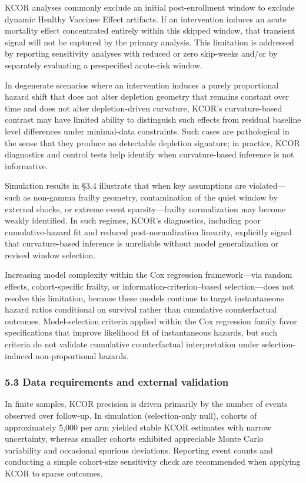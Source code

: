 \documentclass[
]{article}
\begin{document}
KCOR analyses commonly exclude an initial post-enrollment window to
exclude dynamic Healthy Vaccinee Effect artifacts. If an intervention
induces an acute mortality effect concentrated entirely within this
skipped window, that transient signal will not be captured by the
primary analysis. This limitation is addressed by reporting sensitivity
analyses with reduced or zero skip-weeks and/or by separately evaluating
a prespecified acute-risk window.

In degenerate scenarios where an intervention induces a purely
proportional hazard shift that does not alter depletion geometry that
remains constant over time and does not alter depletion-driven
curvature, KCOR's curvature-based contrast may have limited ability to
distinguish such effects from residual baseline level differences under
minimal-data constraints. Such cases are pathological in the sense that
they produce no detectable depletion signature; in practice, KCOR
diagnostics and control tests help identify when curvature-based
inference is not informative.

Simulation results in §3.4 illustrate that when key assumptions are
violated---such as non-gamma frailty geometry, contamination of the
quiet window by external shocks, or extreme event sparsity---frailty
normalization may become weakly identified. In such regimes, KCOR's
diagnostics, including poor cumulative-hazard fit and reduced
post-normalization linearity, explicitly signal that curvature-based
inference is unreliable without model generalization or revised window
selection.

Increasing model complexity within the Cox regression framework---via
random effects, cohort-specific frailty, or information-criterion--based
selection---does not resolve this limitation, because these models
continue to target instantaneous hazard ratios conditional on survival
rather than cumulative counterfactual outcomes. Model-selection criteria
applied within the Cox regression family favor specifications that
improve likelihood fit of instantaneous hazards, but such criteria do
not validate cumulative counterfactual interpretation under
selection-induced non-proportional hazards.

\subsubsection{5.3 Data requirements and external
validation}\label{data-requirements-and-external-validation}

In finite samples, KCOR precision is driven primarily by the number of
events observed over follow-up. In simulation (selection-only null),
cohorts of approximately 5,000 per arm yielded stable KCOR estimates
with narrow uncertainty, whereas smaller cohorts exhibited appreciable
Monte Carlo variability and occasional spurious deviations. Reporting
event counts and conducting a simple cohort-size sensitivity check are
recommended when applying KCOR to sparse outcomes.
\end{document}
